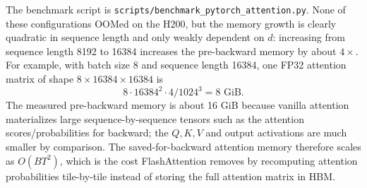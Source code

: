 \documentclass[11pt]{article}
\newcommand{\codepath}[1]{\texttt{#1}}
\begin{document}
\begin{table}[H]
  \centering
  \caption{PyTorch attention timings and memory on one H200. Batch size 8, single head, FP32, 5 warmup steps and 100 measured steps.}
\end{table}
The benchmark script is \codepath{scripts/benchmark\_pytorch\_attention.py}. None of these configurations OOMed on the H200, but the memory growth is clearly quadratic in sequence length and only weakly dependent on $d$: increasing from sequence length 8192 to 16384 increases the pre-backward memory by about $4\times$. For example, with batch size 8 and sequence length 16384, one FP32 attention matrix of shape $8\times 16384\times 16384$ is
\[
  8 \cdot 16384^2 \cdot 4 / 1024^3 = 8 \text{ GiB}.
\]
The measured pre-backward memory is about 16 GiB because vanilla attention materializes large sequence-by-sequence tensors such as the attention scores/probabilities for backward; the $Q,K,V$ and output activations are much smaller by comparison. The saved-for-backward attention memory therefore scales as $O(BT^2)$, which is the cost FlashAttention removes by recomputing attention probabilities tile-by-tile instead of storing the full attention matrix in HBM.
\end{document}
